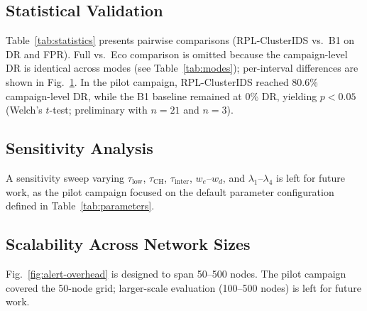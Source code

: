\begin{figure}[!t]
  \centering
  \resizebox{\linewidth}{!}{}
  \caption{\CaptionFigEleven{} \CaptionFigStatusNote}
  \label{fig:mode-sensitivity}
\end{figure}

\subsection{Statistical Validation}
Table~\ref{tab:statistics} presents pairwise comparisons (RPL-ClusterIDS vs.\ B1 on DR and FPR). Full vs.\ Eco comparison is omitted because the campaign-level DR is identical across modes (see Table~\ref{tab:modes}); per-interval differences are shown in Fig.~\ref{fig:mode-sensitivity}.
In the pilot campaign, RPL-ClusterIDS reached 80.6\% campaign-level DR, while the B1 baseline remained at 0\% DR, yielding $p < 0.05$ (Welch's $t$-test; preliminary with $n=21$ and $n=3$).



\subsection{Sensitivity Analysis}
A sensitivity sweep varying $\tau_{\mathrm{low}}$, $\tau_{\mathrm{CH}}$, $\tau_{\mathrm{inter}}$, $w_e$--$w_d$, and $\lambda_1$--$\lambda_4$ is left for future work, as the pilot campaign focused on the default parameter configuration defined in Table~\ref{tab:parameters}.

\subsection{Scalability Across Network Sizes}
Fig.~\ref{fig:alert-overhead} is designed to span 50--500 nodes. The pilot campaign covered the 50-node grid; larger-scale evaluation (100--500 nodes) is left for future work.
